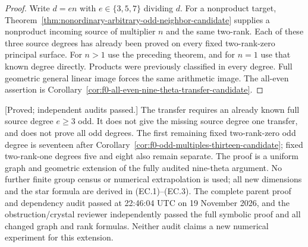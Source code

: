 \begin{proof}
Write $d=en$ with $e\in\{3,5,7\}$ dividing $d$. For a nonproduct
target, Theorem~\ref{thm:nonordinary-arbitrary-odd-neighbor-candidate}
supplies a nonproduct incoming source of multiplier $n$ and the
same two-rank. Each of these three source degrees has already
been proved on every fixed two-rank-zero principal surface.
For $n>1$ use the preceding theorem, and for $n=1$ use that known
degree directly. Products were previously classified in every
degree. Full geometric general linear image forces the same
arithmetic image. The all-even assertion is
Corollary~\ref{cor:f0-all-even-nine-theta-transfer-candidate}.
\end{proof}

\begin{remark}
\label{rem:cubic-component-norm-transfer-scope-candidate}
\textup{[Proved; independent audits passed.]}
The transfer requires an already known full source degree
$e\ge3$ odd. It does not give the missing source degree one
transfer, and does not prove all odd degrees. The first remaining
fixed two-rank-zero odd degree is seventeen after
Corollary~\ref{cor:f0-odd-multiples-thirteen-candidate}; fixed two-rank-one
degrees five and eight also remain separate. The proof is a
uniform graph and geometric extension of the fully audited
nine-theta argument. No further finite group census or numerical
extrapolation is used; all new dimensions and the star formula
are derived in (EC.1)--(EC.3). The complete parent proof and dependency audit passed at
22:46:04 UTC on 19 November 2026, and the obstruction/crystal
reviewer independently passed the full symbolic proof and
all changed graph and rank formulas. Neither audit claims
a new numerical experiment for this extension.
\end{remark}
